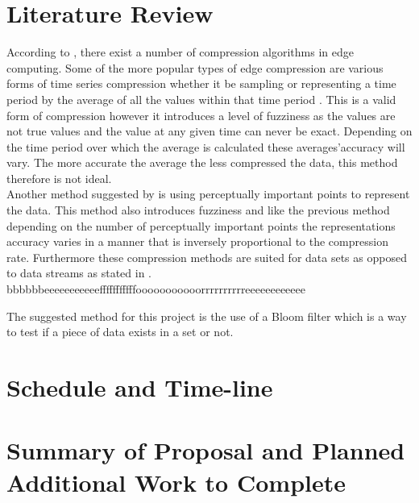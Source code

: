 \documentclass[11pt,journal, a4paper]{IEEEtran}
\begin{document}
\section{Literature Review}
\noindent
According to \cite{accelerating}, there exist a number of compression algorithms in edge computing. Some of the more popular types of edge compression are various forms of time series compression whether it be sampling or representing a time period by the average of all the values within that time period \cite{time1}. This is a valid form of compression however it introduces a level of fuzziness as the values are not true values and the value at any given time can never be exact. Depending on the time period over which the average is calculated these averages'accuracy will vary. The more accurate the average the less compressed the data, this method therefore is not ideal. \\

\noindent
Another method suggested by \cite{PIP} is using perceptually important points to represent the data. This method also introduces fuzziness and like the previous method depending on the number of perceptually important points the representations accuracy varies in a manner that is inversely proportional to the compression rate.  Furthermore these compression methods are suited for data sets as opposed to data streams as stated in \cite{accelerating}. \\

bbbbbbeeeeeeeeeeefffffffffffooooooooooorrrrrrrrrreeeeeeeeeeee

\noindent
The suggested method for this project is the use of a Bloom filter which is a way to  test if a piece of data exists in a set or not. 




\section{Schedule and Time-line}
\noindent


\section{Summary of Proposal and Planned Additional Work to Complete}
\noindent




\end{document}
